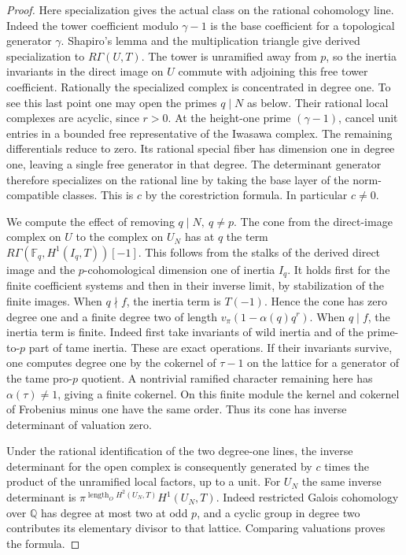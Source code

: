 \documentclass[a4paper,11pt]{article}
\theoremstyle{definition}
\theoremstyle{remark}
\numberwithin{equation}{section}
\begin{document}
\begin{proof}
Here specialization gives the actual class on the rational
cohomology line. Indeed the tower coefficient modulo
\(\gamma-1\) is the base coefficient for a topological
generator \(\gamma\). Shapiro's lemma and the multiplication
triangle give derived specialization to \(R\Gamma(U,T)\).
The tower is unramified away from \(p\), so the inertia
invariants in the direct image on \(U\) commute with adjoining
this free tower coefficient. Rationally the specialized
complex is concentrated in degree one. To see this last point
one may open the primes \(q\mid N\) as below. Their rational
local complexes are acyclic, since \(r>0\). At the
height-one prime \((\gamma-1)\), cancel unit entries in a
bounded free representative of the Iwasawa complex.
The remaining differentials reduce to zero. Its rational
special fiber has dimension one in degree one, leaving a
single free generator in that degree. The determinant
generator therefore specializes on the rational line by
taking the base layer of the norm-compatible classes. This
is \(c\) by the corestriction formula. In particular \(c\ne0\).

We compute the effect of removing \(q\mid N,\ q\ne p\).
The cone from the direct-image complex on \(U\) to the
complex on \(U_N\) has at \(q\) the term
\(R\Gamma(\mathbb F_q,H^1(I_q,T))[-1]\). This follows
from the stalks of the derived direct image and the
\(p\)-cohomological dimension one of inertia \(I_q\).
It holds first for the finite coefficient systems and then
in their inverse limit, by stabilization of the finite
images. When \(q\nmid f\), the inertia term is \(T(-1)\).
Hence the cone has zero degree one and a finite degree two of
length \(v_\pi(1-\alpha(q)q^r)\). When \(q\mid f\), the
inertia term is finite. Indeed first take invariants of wild
inertia and of the prime-to-\(p\) part of tame inertia.
These are exact operations. If their invariants survive, one
computes degree one by the cokernel of \(\tau-1\) on the
lattice for a generator of the tame pro-\(p\) quotient.
A nontrivial ramified character remaining here has
\(\alpha(\tau)\ne1\), giving a finite cokernel. On this finite
module the kernel and cokernel of Frobenius minus one have
the same order. Thus its cone has inverse determinant of
valuation zero.

Under the rational identification of the two degree-one lines,
the inverse determinant for the open complex is consequently
generated by \(c\) times the product of the unramified local
factors, up to a unit. For \(U_N\) the same inverse determinant
is \(\pi^{\operatorname{length}_O H^2(U_N,T)}H^1(U_N,T)\).
Indeed restricted Galois cohomology over \(\mathbb Q\) has degree at
most two at odd \(p\), and a cyclic group in degree two
contributes its elementary divisor to that lattice. Comparing
valuations proves the formula.
\end{proof}
\end{document}
